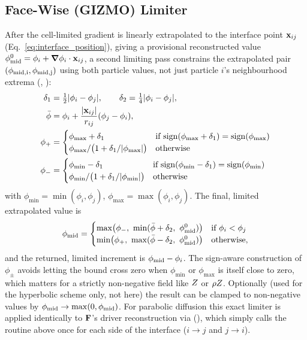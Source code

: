 \subsection{Face-Wise (GIZMO) Limiter}
\label{sec:face-limiter}
After the cell-limited gradient is linearly extrapolated to the
interface point $\mathbf{x}_{ij}$ (Eq.~\eqref{eq:interface_position}), giving a
provisional reconstructed value $\phi_{\rm mid}^{0} = \phi_i + \grad\phi_i
\cdot \mathbf{x}_{ij}$, a second limiting pass constrains the extrapolated pair
$(\phi_{\rm mid,i},\phi_{\rm mid,j})$ using both particle values, not
just particle $i$'s neighbourhood extrema
(,
):
\begin{align}
  \delta_1 &= \tfrac12 |\phi_i - \phi_j| , \qquad \delta_2 = \tfrac14 |\phi_i-\phi_j| , \\
  \bar\phi &= \phi_i + \frac{|\mathbf{x}_{ij}|}{r_{ij}}(\phi_j - \phi_i) , \\
  \phi_{+} &=
    \begin{cases}
      \phi_{\max} + \delta_1 & \text{if } \mathrm{sign}(\phi_{\max}+\delta_1) = \mathrm{sign}(\phi_{\max}) \\
      \phi_{\max}/\big(1+\delta_1/|\phi_{\max}|\big) & \text{otherwise}
    \end{cases} \\
  \phi_{-} &=
    \begin{cases}
      \phi_{\min} - \delta_1 & \text{if } \mathrm{sign}(\phi_{\min}-\delta_1) = \mathrm{sign}(\phi_{\min}) \\
      \phi_{\min}/\big(1+\delta_1/|\phi_{\min}|\big) & \text{otherwise}
    \end{cases}
\end{align}
with $\phi_{\min}=\min(\phi_i,\phi_j)$, $\phi_{\max}=\max(\phi_i,\phi_j)$.
The final, limited extrapolated value is
\begin{equation}
  \phi_{\rm mid} =
  \begin{cases}
    \max\!\big(\phi_-,\ \min(\bar\phi+\delta_2,\ \phi_{\rm mid}^{0})\big) & \text{if } \phi_i < \phi_j \\
    \min\!\big(\phi_+,\ \max(\bar\phi-\delta_2,\ \phi_{\rm mid}^{0})\big) & \text{otherwise,}
  \end{cases}
\end{equation}
and the returned, limited increment is $\phi_{\rm mid} - \phi_i$. The
sign-aware construction of $\phi_\pm$ avoids letting the bound cross zero
when $\phi_{\min}$ or $\phi_{\max}$ is itself close to zero, which
matters for a strictly non-negative field like $Z$ or $\rho Z$.
Optionally (used for the hyperbolic scheme only, not here) the result can
be clamped to non-negative values by $\phi_{\rm mid}\to\max(0,\phi_{\rm
mid})$. For parabolic diffusion this exact limiter is applied
identically to $\mathbf{F}$'s driver reconstruction via
(), which simply
calls the routine above once for each side of the interface ($i\to j$
and $j\to i$).

